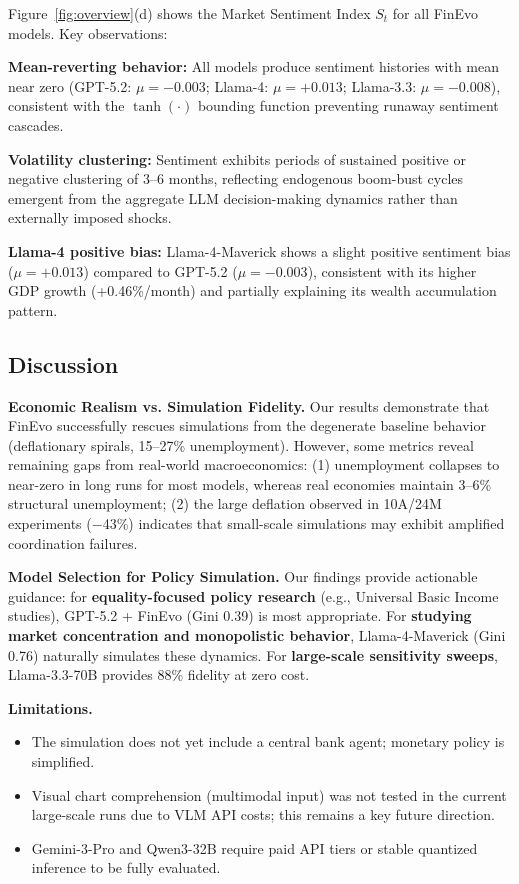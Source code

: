Figure~\ref{fig:overview}(d) shows the Market Sentiment Index $S_t$ for all FinEvo models. Key observations:

\textbf{Mean-reverting behavior:} All models produce sentiment histories with mean near zero (GPT-5.2: $\mu=-0.003$; Llama-4: $\mu=+0.013$; Llama-3.3: $\mu=-0.008$), consistent with the $\tanh(\cdot)$ bounding function preventing runaway sentiment cascades.

\textbf{Volatility clustering:} Sentiment exhibits periods of sustained positive or negative clustering of 3--6 months, reflecting endogenous boom-bust cycles emergent from the aggregate LLM decision-making dynamics rather than externally imposed shocks.

\textbf{Llama-4 positive bias:} Llama-4-Maverick shows a slight positive sentiment bias ($\mu=+0.013$) compared to GPT-5.2 ($\mu=-0.003$), consistent with its higher GDP growth (+0.46\%/month) and partially explaining its wealth accumulation pattern.

\subsection{Discussion}
\label{sec:discussion}

\noindent\textbf{Economic Realism vs. Simulation Fidelity.}
Our results demonstrate that FinEvo successfully rescues simulations from the degenerate baseline behavior (deflationary spirals, 15--27\% unemployment). However, some metrics reveal remaining gaps from real-world macroeconomics: (1) unemployment collapses to near-zero in long runs for most models, whereas real economies maintain 3--6\% structural unemployment; (2) the large deflation observed in 10A/24M experiments ($-$43\%) indicates that small-scale simulations may exhibit amplified coordination failures.

\noindent\textbf{Model Selection for Policy Simulation.}
Our findings provide actionable guidance: for \textbf{equality-focused policy research} (e.g., Universal Basic Income studies), GPT-5.2 + FinEvo (Gini 0.39) is most appropriate. For \textbf{studying market concentration and monopolistic behavior}, Llama-4-Maverick (Gini 0.76) naturally simulates these dynamics. For \textbf{large-scale sensitivity sweeps}, Llama-3.3-70B provides 88\% fidelity at zero cost.

\noindent\textbf{Limitations.}
\begin{itemize}
    \item The simulation does not yet include a central bank agent; monetary policy is simplified.
    \item Visual chart comprehension (multimodal input) was not tested in the current large-scale runs due to VLM API costs; this remains a key future direction.
    \item Gemini-3-Pro and Qwen3-32B require paid API tiers or stable quantized inference to be fully evaluated.
\end{itemize}

